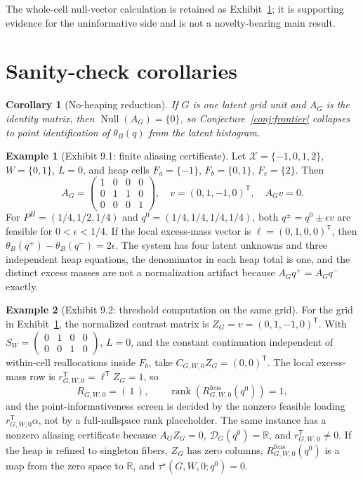 \documentclass[11pt]{article}
\newcommand{\transpose}{\mathsf{T}}
\theoremstyle{definition}
\newtheorem{example}{Example}
\theoremstyle{plain}
\newtheorem{corollary}{Corollary}
\theoremstyle{remark}
\begin{document}
The whole-cell null-vector calculation is retained as Exhibit~\ref{ex:alias}; it is supporting evidence for the uninformative side and is not a novelty-bearing main result.

\section{Sanity-check corollaries}
\begin{corollary}[No-heaping reduction]\label{cor:noheap}
If \(G\) is one latent grid unit and \(A_G\) is the identity matrix, then \(\operatorname{Null}(A_G)=\{0\}\), so Conjecture~\ref{conj:frontier} collapses to point identification of \(\theta_B(q)\) from the latent histogram.
\end{corollary}

\begin{example}[Exhibit 9.1: finite aliasing certificate]\label{ex:alias}
Let \(\mathcal{X}=\{-1,0,1,2\}\), \(W=\{0,1\}\), \(L=0\), and heap cells \(F_a=\{-1\}\), \(F_b=\{0,1\}\), \(F_c=\{2\}\).  Then
\[
A_G=\begin{pmatrix}1&0&0&0\\0&1&1&0\\0&0&0&1\end{pmatrix},
\quad
v=(0,1,-1,0)^{\transpose},
\quad
A_Gv=0.
\]
For \(P^H=(1/4,1/2,1/4)\) and \(q^0=(1/4,1/4,1/4,1/4)\), both \(q^\pm=q^0\pm\epsilon v\) are feasible for \(0<\epsilon<1/4\).  If the local excess-mass vector is \(\ell=(0,1,0,0)^{\transpose}\), then \(\theta_B(q^+)-\theta_B(q^-)=2\epsilon\).  The system has four latent unknowns and three independent heap equations, the denominator in each heap total is one, and the distinct excess masses are not a normalization artifact because \(A_Gq^+=A_Gq^-\) exactly.
\end{example}

\begin{example}[Exhibit 9.2: threshold computation on the same grid]\label{ex:threshold}
For the grid in Exhibit~\ref{ex:alias}, the normalized contrast matrix is \(Z_G=v=(0,1,-1,0)^{\transpose}\).  With \(S_W=\begin{pmatrix}0&1&0&0\\0&0&1&0\end{pmatrix}\), \(L=0\), and the constant continuation independent of within-cell reallocations inside \(F_b\), take \(C_{G,W,0}Z_G=(0,0)^{\transpose}\).  The local excess-mass row is \(r_{G,W,0}^{\transpose}=\ell^{\transpose}Z_G=1\), so
\[
R_{G,W,0}=
(\,1\,),
\qquad
\operatorname{rank}(R^{\mathrm{feas}}_{G,W,0}(q^0))=1,
\]
and the point-informativeness screen is decided by the nonzero feasible loading \(r_{G,W,0}^{\transpose}\alpha\), not by a full-nullspace rank placeholder.  The same instance has a nonzero aliasing certificate because \(A_GZ_G=0\), \(\mathcal{D}_G(q^0)=\mathbb{R}\), and \(r_{G,W,0}^{\transpose}\neq0\).  If the heap is refined to singleton fibers, \(Z_G\) has zero columns, \(R^{\mathrm{feas}}_{G,W,0}(q^0)\) is a map from the zero space to \(\mathbb{R}\), and \(\tau^\star(G,W,0;q^0)=0\).
\end{example}
\end{document}
